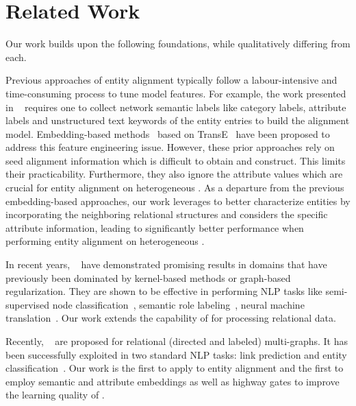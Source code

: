 
	
	\section{Related Work}
    Our work builds upon the following foundations, while qualitatively differing from each.

    	 Previous approaches of entity alignment typically
follow a labour-intensive and time-consuming process to tune model features. For example, the work presented in ~\cite{Wang2017} requires
one to collect network semantic labels like category labels, attribute labels and unstructured text keywords of the entity entries to build
the alignment model. Embedding-based methods~\cite{hao2016joint,chen2016multilingual,sun2017cross,zhu2017iterative} based on
TransE~\cite{bordes2013translating} have been proposed to address this feature engineering issue. However, these prior approaches rely on
seed alignment information which is difficult to obtain and construct. This limits their practicability. Furthermore, they also ignore the
attribute values which are crucial for entity alignment on heterogeneous \KGs. As a departure from the previous embedding-based approaches,
our work leverages \RGCNs to better characterize entities by incorporating the neighboring relational structures and considers the specific
attribute information, leading to significantly better performance when performing entity alignment on heterogeneous \KGs.

	 In recent years, \GCNs~\cite{Duvenaud2015Convolutional,Kearnes2016Molecular}
    have demonstrated promising results in domains that have previously been dominated by kernel-based methods or graph-based regularization.
    They are shown to be effective in performing NLP tasks like semi-supervised
    node classification~\cite{Kipf2016Semi}, semantic role labeling~\cite{Marcheggiani2017Encoding}, neural machine
    translation~\cite{Bastings2017Graph}. Our work extends the capability of \GCNs for processing relational data.


	Recently, \RGCNs~\cite{Schlichtkrull2017Modeling} are proposed  for relational (directed and labeled) multi-graphs. It has been
successfully exploited in two standard NLP tasks: link prediction and entity classification~\cite{Schlichtkrull2017Modeling}. Our work is
the first to apply \RGCNs to entity alignment and the first to employ semantic and attribute embeddings as well as highway gates to improve
the learning quality of \RGCNs.

